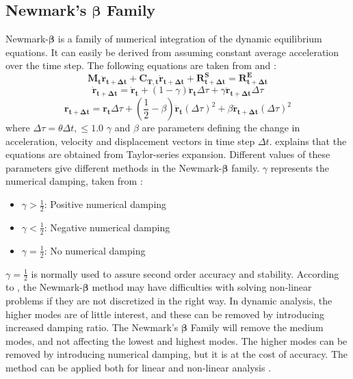 \subsection{Newmark's $\boldsymbol{\beta}$ Family}
\label{sec:newmark}
Newmark-$\boldsymbol{\beta}$ is a family of numerical integration of the dynamic equilibrium equations. It can easily be derived from assuming constant average acceleration over the time step. The following equations are taken from \cite{sintef2017} and \cite{Mathisen1990}: 
\begin{equation}
   \boldsymbol{M_t \ddot{r}_{t+\Delta t}} + \boldsymbol{C_{T,t}\dot{r}_{t+\Delta t}} + \boldsymbol{R_{t+\Delta t}^S}=\boldsymbol{{R_{t+\Delta t}^E}}
   \label{eq:new}
\end{equation}
\begin{equation}
    \boldsymbol{\dot{r}_{t+\Delta t}} =\boldsymbol{\dot{r}_{t}}+(1-\gamma)\boldsymbol{\ddot{r}_{t}}\Delta \tau + \gamma \boldsymbol{\ddot{r}_{t+\Delta t}} \Delta \tau
\end{equation}
\begin{equation}
    \boldsymbol{r_{t+\Delta t}} =\boldsymbol{r_{t}}\Delta \tau + (\frac{1}{2}-\beta)\boldsymbol{\ddot{r}_{t}}(\Delta \tau)^2 + \beta \boldsymbol{\ddot{r}_{t+\Delta t}} (\Delta \tau)^2
\end{equation}
where  $\Delta \tau =\theta \Delta t, \leq 1.0$\newline
\newline
$\gamma$ and $\beta$ are parameters defining the change in acceleration, velocity and displacement vectors in time step $\Delta t$. \cite{Langen1999} explains that the equations are obtained from Taylor-series expansion.  Different values of these parameters give different methods in the Newmark-$\boldsymbol{\beta}$ family. $\gamma$ represents the numerical damping, taken from \cite{sintef2017}: 
\begin{itemize}
    \item $\gamma > \frac{1}{2}$: Positive numerical damping
    \item $\gamma < \frac{1}{2}$: Negative numerical damping
    \item $\gamma = \frac{1}{2}$: No numerical damping
\end{itemize}

\noindent $\gamma = \frac{1}{2}$ is normally used to assure second order accuracy and stability. 
According to \cite{Mathisen1990}, the Newmark-$\boldsymbol{\beta}$ method may have difficulties with solving non-linear problems if they are not discretized in the right way. \newline
\newline
\noindent In dynamic analysis, the higher modes are of little interest, and these can be removed by introducing increased damping ratio. The Newmark's $\boldsymbol{\beta}$ Family will remove the medium modes, and not affecting the lowest and highest modes. The higher modes can be removed by introducing numerical damping, but it is at the cost of accuracy.  The method can be applied both for linear and non-linear analysis \cite{sintef2017}.

